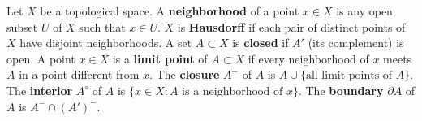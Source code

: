 Let $X$ be a topological space.
A \textbf{neighborhood} of a point $x \in X$ is any open subset $U$ of $X$ such that $x \in U$.
$X$ is \textbf{Hausdorff} if each pair of distinct points of $X$ have disjoint neighborhoods.
A set $A \subset X$ is \textbf{closed} if $A'$ (its complement) is open.
A point $x \in X$ is a \textbf{limit point} of $A \subset X$ if every neighborhood of $x$ meets $A$ in a point different from $x$.
The \textbf{closure} $A^{-}$ of $A$ is $A \cup \{\text{all limit points of } A\}$.
The \textbf{interior} $A^{\circ}$ of $A$ is $\{x \in X : A \text{ is a neighborhood of } x\}$.
The \textbf{boundary} $\partial A$ of $A$ is $A^{-} \cap (A')^{-}$.
